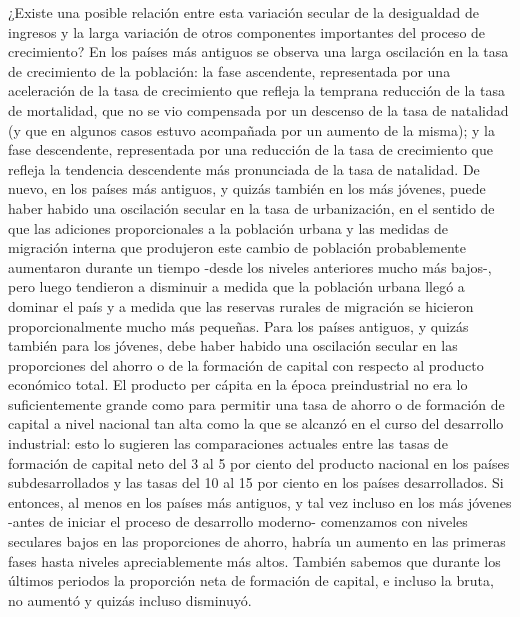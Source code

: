 ¿Existe una posible relación entre esta variación secular de la desigualdad de ingresos y la larga variación de otros componentes importantes del proceso de crecimiento? En los países más antiguos se observa una larga oscilación en la tasa de crecimiento de la población: la fase ascendente, representada por una aceleración de la tasa de crecimiento que refleja la temprana reducción de la tasa de mortalidad, que no se vio compensada por un descenso de la tasa de natalidad (y que en algunos casos estuvo acompañada por un aumento de la misma); y la fase descendente, representada por una reducción de la tasa de crecimiento que refleja la tendencia descendente más pronunciada de la tasa de natalidad. De nuevo, en los países más antiguos, y quizás también en los más jóvenes, puede haber habido una oscilación secular en la tasa de urbanización, en el sentido de que las adiciones proporcionales a la población urbana y las medidas de migración interna que produjeron este cambio de población probablemente aumentaron durante un tiempo -desde los niveles anteriores mucho más bajos-, pero luego tendieron a disminuir a medida que la población urbana llegó a dominar el país y a medida que las reservas rurales de migración se hicieron proporcionalmente mucho más pequeñas. Para los países antiguos, y quizás también para los jóvenes, debe haber habido una oscilación secular en las proporciones del ahorro o de la formación de capital con respecto al producto económico total. El producto per cápita en la época preindustrial no era lo suficientemente grande como para permitir una tasa de ahorro o de formación de capital a nivel nacional tan alta como la que se alcanzó en el curso del desarrollo industrial: esto lo sugieren las comparaciones actuales entre las tasas de formación de capital neto del 3 al 5 por ciento del producto nacional en los países subdesarrollados y las tasas del 10 al 15 por ciento en los países desarrollados. Si entonces, al menos en los países más antiguos, y tal vez incluso en los más jóvenes -antes de iniciar el proceso de desarrollo moderno- comenzamos con niveles seculares bajos en las proporciones de ahorro, habría un aumento en las primeras fases hasta niveles apreciablemente más altos. También sabemos que durante los últimos periodos la proporción neta de formación de capital, e incluso la bruta, no aumentó y quizás incluso disminuyó.\\
